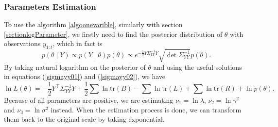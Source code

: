 \subsubsection*{Parameters Estimation}

To use the algorithm \ref{algoonevarible}, similarly with section \ref{sectionlogParameter}, we firstly need to find the posterior distribution of $\theta$ with observations $y_{1:t}$, which in fact is 
\begin{equation*}
p(\theta \mid Y) \propto p(Y\mid\theta)p(\theta) \propto e^{-\frac{1}{2} Y \Sigma_{YY}^{-1} Y } \sqrt{\det \Sigma_{YY}^{-1}} p(\theta).
\end{equation*}
By taking natural logarithm on the posterior of $\theta$ and using the useful solutions in equations (\ref{sigmayy01}) and (\ref{sigmayy02}), we have 
\begin{equation}\label{simuOUlogL}
\ln L(\theta) = -\frac{1}{2}Y^\top\Sigma_{YY}^{-1}Y+\frac{1}{2}\sum\ln\mbox{tr}(B)-\sum\ln\mbox{tr}(L)+\sum\ln\mbox{tr}(R) + \ln p(\theta).
\end{equation}
Because of all parameters are positive, we are estimating $\nu_1=\ln\lambda$, $\nu_2=\ln\gamma^2$ and $\nu_3=\ln\sigma^2$ instead. When the estimation process is done, we can transform them back to the original scale by taking exponential. 

